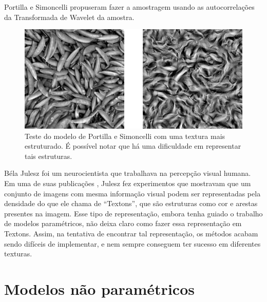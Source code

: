 
Portilla e Simoncelli \cite{Portilla1999}
propuseram fazer a amostragem usando
as autocorrelações da Transformada
de Wavelet da amostra.

\begin{figure}[!ht]
	\centering
	\includegraphics[width=\linewidth*2/3]{files/assets/articles/portilla.png}
	\caption{Teste do modelo de Portilla e Simoncelli com uma
	textura mais estruturado. É possível notar que há uma
	dificuldade em representar tais estruturas.}
	\label{img:preview}
\end{figure}




Béla Julesz foi um neurocientista que
trabalhava na percepção visual humana.
Em uma de suas publicações \cite{Julesz1981},
Julesz fez experimentos que mostravam
que um conjunto de imagens com mesma
informação visual podem ser representadas
pela densidade do que ele chama de
``Textons'', que são estruturas
como cor e arestas presentes na imagem.
Esse tipo de representação, embora tenha
guiado o trabalho de modelos paramétricos,
não deixa claro como fazer essa representação
em Textons. Assim, na tentativa de encontrar
tal representação, os métodos acabam sendo
difíceis de implementar, e nem sempre
conseguem ter sucesso em diferentes texturas.





\section{Modelos não paramétricos}


